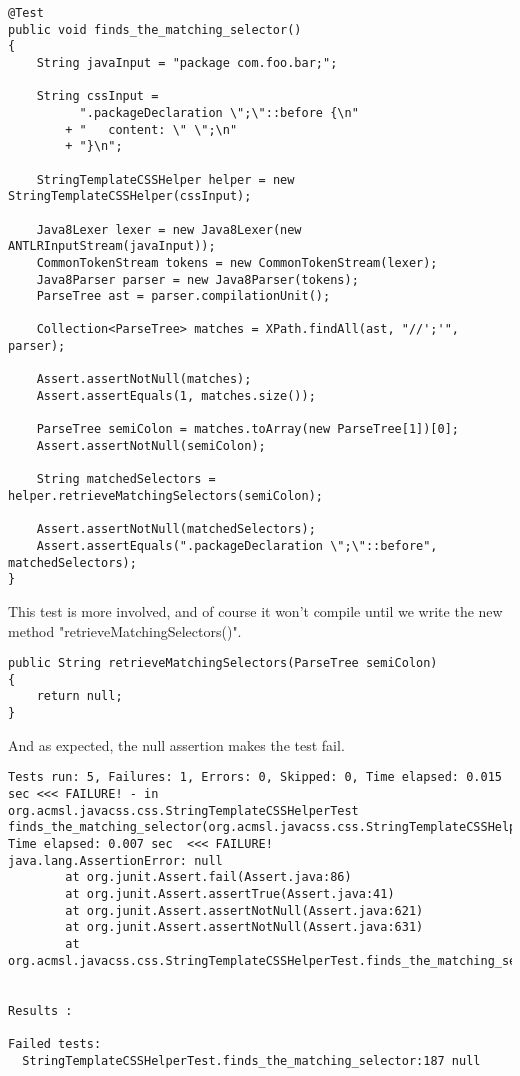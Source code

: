 \documentclass[11pt]{article}
\begin{document}
\begin{verbatim}
@Test
public void finds_the_matching_selector()
{
    String javaInput = "package com.foo.bar;";

    String cssInput =
          ".packageDeclaration \";\"::before {\n"
        + "   content: \" \";\n"
        + "}\n";

    StringTemplateCSSHelper helper = new StringTemplateCSSHelper(cssInput);

    Java8Lexer lexer = new Java8Lexer(new ANTLRInputStream(javaInput));
    CommonTokenStream tokens = new CommonTokenStream(lexer);
    Java8Parser parser = new Java8Parser(tokens);
    ParseTree ast = parser.compilationUnit();

    Collection<ParseTree> matches = XPath.findAll(ast, "//';'", parser);

    Assert.assertNotNull(matches);
    Assert.assertEquals(1, matches.size());

    ParseTree semiColon = matches.toArray(new ParseTree[1])[0];
    Assert.assertNotNull(semiColon);

    String matchedSelectors = helper.retrieveMatchingSelectors(semiColon);

    Assert.assertNotNull(matchedSelectors);
    Assert.assertEquals(".packageDeclaration \";\"::before", matchedSelectors);
}
\end{verbatim}

This test is more involved, and of course it won't compile until we write the new method "retrieveMatchingSelectors()".

\begin{verbatim}
public String retrieveMatchingSelectors(ParseTree semiColon)
{
    return null;
}
\end{verbatim}

And as expected, the null assertion makes the test fail.

\begin{verbatim}
Tests run: 5, Failures: 1, Errors: 0, Skipped: 0, Time elapsed: 0.015 sec <<< FAILURE! - in org.acmsl.javacss.css.StringTemplateCSSHelperTest
finds_the_matching_selector(org.acmsl.javacss.css.StringTemplateCSSHelperTest)  Time elapsed: 0.007 sec  <<< FAILURE!
java.lang.AssertionError: null
        at org.junit.Assert.fail(Assert.java:86)
        at org.junit.Assert.assertTrue(Assert.java:41)
        at org.junit.Assert.assertNotNull(Assert.java:621)
        at org.junit.Assert.assertNotNull(Assert.java:631)
        at org.acmsl.javacss.css.StringTemplateCSSHelperTest.finds_the_matching_selector(StringTemplateCSSHelperTest.java:187)


Results :

Failed tests:
  StringTemplateCSSHelperTest.finds_the_matching_selector:187 null
\end{verbatim}
\end{document}
